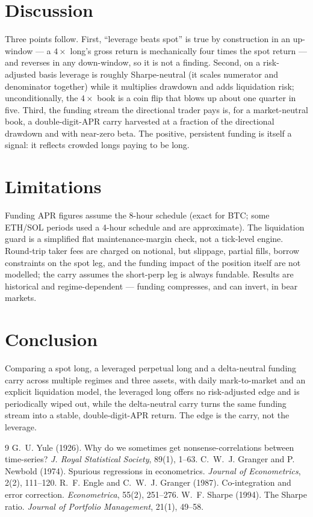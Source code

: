 \documentclass[11pt]{article}
\begin{document}
\section{Discussion}
Three points follow. First, ``leverage beats spot'' is true by construction in an
up-window --- a $4\times$ long's gross return is mechanically four times the spot
return --- and reverses in any down-window, so it is not a finding. Second, on a
risk-adjusted basis leverage is roughly Sharpe-neutral (it scales numerator and
denominator together) while it multiplies drawdown and adds liquidation risk;
unconditionally, the $4\times$ book is a coin flip that blows up about one quarter
in five. Third, the funding stream the directional trader pays is, for a
market-neutral book, a double-digit-APR carry harvested at a fraction of the
directional drawdown and with near-zero beta. The positive, persistent funding is
itself a signal: it reflects crowded longs paying to be long.

\section{Limitations}
Funding APR figures assume the 8-hour schedule (exact for BTC; some ETH/SOL periods
used a 4-hour schedule and are approximate). The liquidation guard is a simplified
flat maintenance-margin check, not a tick-level engine. Round-trip taker fees are
charged on notional, but slippage, partial fills, borrow constraints on the spot
leg, and the funding impact of the position itself are not modelled; the carry
assumes the short-perp leg is always fundable. Results are historical and
regime-dependent --- funding compresses, and can invert, in bear markets.

\section{Conclusion}
Comparing a spot long, a leveraged perpetual long and a delta-neutral funding carry
across multiple regimes and three assets, with daily mark-to-market and an explicit
liquidation model, the leveraged long offers no risk-adjusted edge and is
periodically wiped out, while the delta-neutral carry turns the same funding stream
into a stable, double-digit-APR return. The edge is the carry, not the leverage.

\begin{thebibliography}{9}
\small
{} G.~U. Yule (1926). Why do we sometimes get nonsense-correlations
between time-series? \emph{J. Royal Statistical Society}, 89(1), 1--63.
 C.~W.~J. Granger and P. Newbold (1974). Spurious
regressions in econometrics. \emph{Journal of Econometrics}, 2(2), 111--120.
 R.~F. Engle and C.~W.~J. Granger (1987). Co-integration
and error correction. \emph{Econometrica}, 55(2), 251--276.
 W.~F. Sharpe (1994). The Sharpe ratio. \emph{Journal of
Portfolio Management}, 21(1), 49--58.
\end{thebibliography}
\end{document}
